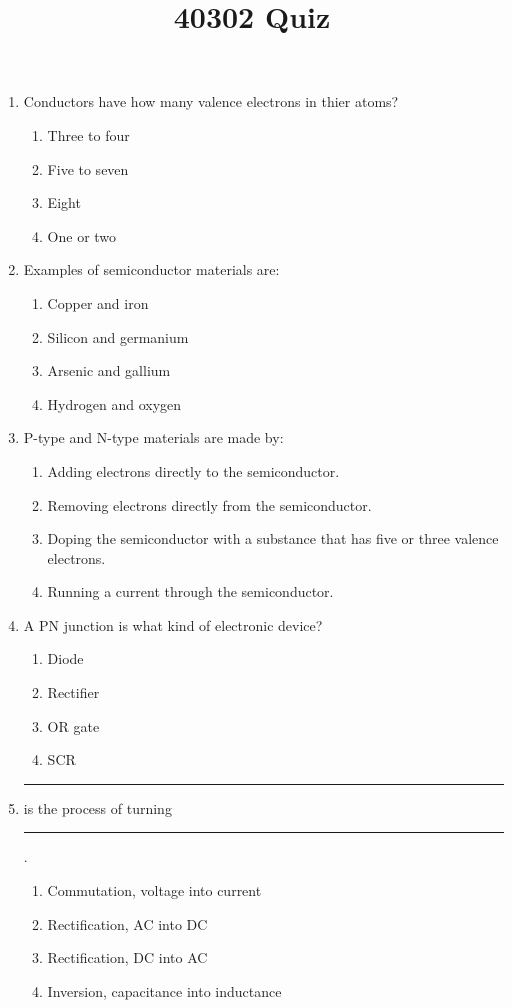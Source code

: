 \documentclass[10pt]{article}
\title{40302 Quiz}
\begin{document}
\begin{multicols}{2}
\begin{enumerate}
\item Conductors have how many valence electrons in thier atoms?
	\begin{enumerate}
	\item Three to four
	\item Five to seven
	\item Eight
	\item One or two
	\end{enumerate}
\item Examples of semiconductor materials are:
	\begin{enumerate}
	\item Copper and iron
	\item Silicon and germanium
	\item Arsenic and gallium
	\item Hydrogen and oxygen
	\end{enumerate}
\item P-type and N-type materials are made by:
	\begin{enumerate}
	\item Adding electrons directly to the semiconductor.
	\item Removing electrons directly from the semiconductor.
	\item Doping the semiconductor with a substance that has five or three valence electrons.
	\item Running a current through the semiconductor.
	\end{enumerate}
\item A PN junction is what kind of electronic device?
	\begin{enumerate}
	\item Diode
	\item Rectifier
	\item OR gate
	\item SCR
	\end{enumerate}
\item \rule{1cm}{0.15mm} is the process of turning \rule{1cm}{0.15mm}.
	\begin{enumerate}
	\item Commutation, voltage into current
	\item Rectification, AC into DC
	\item Rectification, DC into AC
	\item Inversion, capacitance into inductance
	\end{enumerate}

\end{enumerate}
\end{multicols}
\end{document}
